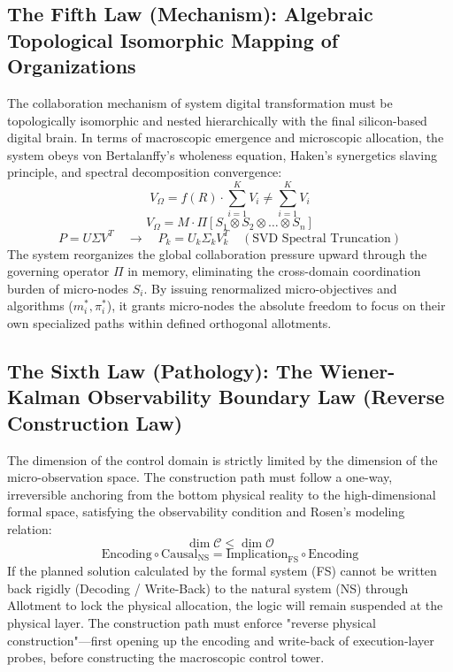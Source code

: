 \documentclass[11pt,a4paper]{article}
\begin{document}
\subsection*{The Fifth Law (Mechanism): Algebraic Topological Isomorphic Mapping of Organizations}
The collaboration mechanism of system digital transformation must be topologically isomorphic and nested hierarchically with the final silicon-based digital brain. In terms of macroscopic emergence and microscopic allocation, the system obeys von Bertalanffy's wholeness equation, Haken's synergetics slaving principle, and spectral decomposition convergence:
\begin{equation}
    V_{\Omega} = f(R) \cdot \sum_{i=1}^{K} V_i \neq \sum_{i=1}^{K} V_i
\end{equation}
\begin{equation}
    V_{\Omega} = M \cdot \Pi \left[ S_1 \otimes S_2 \otimes \dots \otimes S_n \right]
\end{equation}
\begin{equation}
    P = U \Sigma V^T \quad \to \quad P_k = U_k \Sigma_k V_k^T \quad (\text{SVD Spectral Truncation})
\end{equation}
The system reorganizes the global collaboration pressure upward through the governing operator $\Pi$ in memory, eliminating the cross-domain coordination burden of micro-nodes $S_i$. By issuing renormalized micro-objectives and algorithms ($m_i^*, \pi_i^*$), it grants micro-nodes the absolute freedom to focus on their own specialized paths within defined orthogonal allotments.

\subsection*{The Sixth Law (Pathology): The Wiener-Kalman Observability Boundary Law (Reverse Construction Law)}
The dimension of the control domain is strictly limited by the dimension of the micro-observation space. The construction path must follow a one-way, irreversible anchoring from the bottom physical reality to the high-dimensional formal space, satisfying the observability condition and Rosen's modeling relation:
\begin{equation}
    \dim \mathcal{C} \le \dim \mathcal{O}
\end{equation}
\begin{equation}
    \text{Encoding} \circ \text{Causal}_{\text{NS}} = \text{Implication}_{\text{FS}} \circ \text{Encoding}
\end{equation}
If the planned solution calculated by the formal system (FS) cannot be written back rigidly (Decoding / Write-Back) to the natural system (NS) through Allotment to lock the physical allocation, the logic will remain suspended at the physical layer. The construction path must enforce "reverse physical construction"—first opening up the encoding and write-back of execution-layer probes, before constructing the macroscopic control tower.
\end{document}
